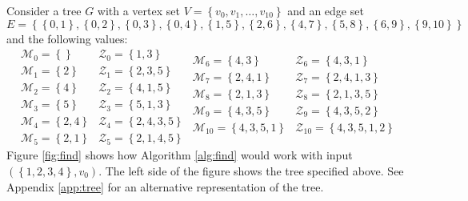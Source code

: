 Consider a tree $G$ with a vertex set $V = \left\{{v_0,v_1,\ldots,v_{10}}\right\}$
and an edge set $E = \left\{{\left\{{0,1}\right\},\left\{{0,2}\right\},\left\{{0,3}\right\},\left\{{0,4}\right\},\left\{{1,5}\right\},\left\{{2,6}\right\},\left\{{4,7}\right\},\left\{{5,8}\right\},\left\{{6,9}\right\},\left\{{9,10}\right\}}\right\}$
and the following values:
\[
    \begin{array}{ll}
        \mathcal{M}_0 = \left\{{}\right\}           & \mathcal{Z}_0 = \left\{{1,3}\right\} \\
        \mathcal{M}_1 = \left\{{2}\right\}          & \mathcal{Z}_1 = \left\{{2,3,5}\right\} \\
        \mathcal{M}_2 = \left\{{4}\right\}          & \mathcal{Z}_2 = \left\{{4,1,5}\right\} \\
        \mathcal{M}_3 = \left\{{5}\right\}          & \mathcal{Z}_3 = \left\{{5,1,3}\right\} \\
        \mathcal{M}_4 = \left\{{2,4}\right\}        & \mathcal{Z}_4 = \left\{{2,4,3,5}\right\} \\
        \mathcal{M}_5 = \left\{{2,1}\right\}        & \mathcal{Z}_5 = \left\{{2,1,4,5}\right\}
    \end{array}
    \begin{array}{ll}
        \mathcal{M}_6 = \left\{{4,3}\right\}        & \mathcal{Z}_6 = \left\{{4,3,1}\right\} \\
        \mathcal{M}_7 = \left\{{2,4,1}\right\}      & \mathcal{Z}_7 = \left\{{2,4,1,3}\right\} \\
        \mathcal{M}_8 = \left\{{2,1,3}\right\}      & \mathcal{Z}_8 = \left\{{2,1,3,5}\right\} \\
        \mathcal{M}_9 = \left\{{4,3,5}\right\}      & \mathcal{Z}_9 = \left\{{4,3,5,2}\right\} \\
        \mathcal{M}_{10} = \left\{{4,3,5,1}\right\} & \mathcal{Z}_{10} = \left\{{4,3,5,1,2}\right\} \\
    \end{array}
\]
Figure \ref{fig:find} shows how Algorithm \ref{alg:find} would work with input
$(\left\{{1,2,3,4}\right\}, v_0)$. The left side of the figure shows the tree
specified above. See Appendix \ref{app:tree} for an alternative representation
of the tree.

